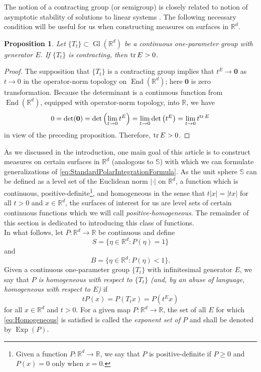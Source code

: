 \documentclass[11pt]{article}
\newtheorem{proposition}[theorem]{Proposition}
\newcommand\End{\operatorname{End}} %
\newcommand\Gl{\operatorname{Gl}} %
\newcommand\Exp{\operatorname{Exp}}
\renewcommand\det{\operatorname{det}}
\begin{document}
\noindent The notion of a contracting group (or semigroup) is closely related to notion of asymptotic stability of solutions to linear systems \cite{Braun1993}. The following necessary condition will be useful for us when constructing measures on surfaces in $\mathbb{R}^d$.

\begin{proposition}\label{prop:ContractingTrace}
Let $\{T_t\}\subset\Gl(\mathbb{R}^d)$ be a continuous one-parameter group with generator $E$. If $\{T_t\}$ is  contracting, then $\tr E>0$. 
\end{proposition}
\begin{proof}
The supposition that $\{T_t\}$ is a contracting group implies that $t^E\to \mathbf{0}$ as $t\to 0$ in the operator-norm topology on $\End(\mathbb{R}^d)$; here $\mathbf{0}$ is zero transformation. Because the determinant is a continuous function from $\End(\mathbb{R}^d)$, equipped with operator-norm topology, into $\mathbb{R}$, we have
\begin{equation*}
0=\det(\mathbf{0})=\det\left(\lim_{t\to 0}t^E\right)=\lim_{t\to 0}\det\left(t^E\right)=\lim_{t\to 0}t^{\tr E}
\end{equation*}
in view of the preceding proposition. Therefore, $\tr E>0$.
\end{proof}

\noindent As we discussed in the introduction, one main goal of this article is to construct measures on certain surfaces in $\mathbb{R}^d$ (analogous to $\mathbb{S}$) with which we can formulate generalizations of \eqref{eq:StandardPolarIntegrationFormula}. As the unit sphere $\mathbb{S}$ can be defined as a level set of the Euclidean norm $|\cdot|$ on $\mathbb{R}^d$, a function which is continuous,  positive-definite\footnote{Given a function $P:\mathbb{R}^d\to\mathbb{R}$, we say that $P$ is positive-definite if $P\geq 0$ and $P(x)=0$ only when $x=0$.}, and homogeneous in the sense that $t|x|=|tx|$ for all $t>0$ and $x\in\mathbb{R}^d$, the surfaces of interest for us are level sets of certain continuous functions which we will call \textit{positive-homogeneous}. The remainder of this section is dedicated to introducing this class of functions.\\

\noindent In what follows, let $P:\mathbb{R}^d\to\mathbb{R}$ be continuous and define
\begin{equation}
S=\{\eta\in\mathbb{R}^d:P(\eta)=1\}
\end{equation}
and
\begin{equation*}
B=\{\eta\in\mathbb{R}^d:P(\eta)<1\}.
\end{equation*}
Given a continuous one-parameter group $\{T_t\}$ with infinitesimal generator $E$, we say that \textit{$P$ is homogeneous with respect to $\{T_t\}$ (and, by an abuse of language, homogeneous with respect to $E$)} if
\begin{equation}\label{eq:Homogeneous}
tP(x)=P(T_tx)=P\left(t^Ex\right)
\end{equation}
for all $x\in\mathbb{R}^d$ and $t>0$. For a given map $P:\mathbb{R}^d\to\mathbb{R}$, the set of all $E$ for which \eqref{eq:Homogeneous} is satisfied is called the \textit{exponent set of $P$} and shall be denoted by $\Exp(P)$. 
\end{document}
